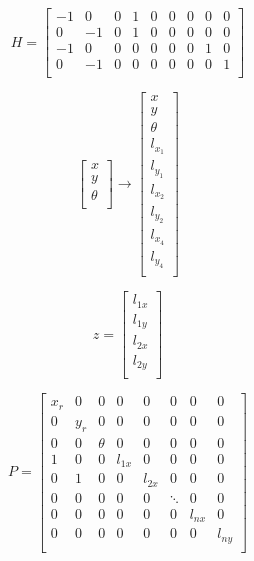 \documentclass[11pt]{report}
\begin{document}
$$
H =
\begin{bmatrix}
    -1 & 0 & 0 & 1 & 0 & 0 & 0 & 0 & 0 \\
    0 & -1 & 0 & 1 & 0 & 0 & 0 & 0 & 0 \\
    -1 & 0 & 0 & 0 & 0 & 0 & 0 & 1 & 0 \\
    0 & -1 & 0 & 0 & 0 & 0 & 0 & 0 & 1 \\
\end{bmatrix}
$$


$$
\begin{bmatrix}
    x \\
    y \\
    \theta \\
\end{bmatrix}
\rightarrow
\begin{bmatrix}
    x \\
    y \\
    \theta \\
    l_{x_1} \\
    l_{y_1} \\
    l_{x_2} \\
    l_{y_2} \\
    l_{x_4} \\
    l_{y_4} \\
\end{bmatrix}
$$

$$
z = 
\begin{bmatrix}
    l_{1x} \\
    l_{1y} \\
    l_{2x} \\
    l_{2y} \\
\end{bmatrix}
$$

$$
P =
\begin{bmatrix}
    x_r & 0 & 0 & 0 & 0 & 0 & 0 & 0 \\
    0 & y_r & 0 & 0 & 0 & 0 & 0 & 0 \\
    0 & 0 & \theta & 0 & 0 & 0 & 0 & 0 \\
    1 & 0 & 0 & l_{1x} & 0 & 0 & 0 & 0 \\
    0 & 1 & 0 & 0 & l_{2x} & 0 & 0 & 0 \\
    0 & 0 & 0 & 0 & 0 & \ddots & 0 & 0 \\
    0 & 0 & 0 & 0 & 0 & 0 & l_{nx} & 0 \\
    0 & 0 & 0 & 0 & 0 & 0 & 0 & l_{ny} \\
\end{bmatrix}
$$

    \medskip
    
\end{document}
